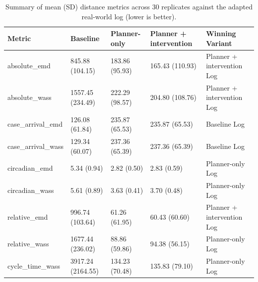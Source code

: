 \begin{table}
\caption{Summary of mean (SD) distance metrics across 30 replicates against the adapted real-world log (lower is better).}
\label{tab:results}
\begin{tabular}{lllll}
\toprule
Metric & Baseline & Planner-only & Planner + intervention & Winning Variant \\
\midrule
absolute_emd & 845.88 (104.15) & 183.86 (95.93) & 165.43 (110.93) & Planner + intervention Log \\
absolute_wass & 1557.45 (234.49) & 222.29 (98.57) & 204.80 (108.76) & Planner + intervention Log \\
case_arrival_emd & 126.08 (61.84) & 235.87 (65.53) & 235.87 (65.53) & Baseline Log \\
case_arrival_wass & 129.34 (60.07) & 237.36 (65.39) & 237.36 (65.39) & Baseline Log \\
circadian_emd & 5.34 (0.94) & 2.82 (0.50) & 2.83 (0.59) & Planner-only Log \\
circadian_wass & 5.61 (0.89) & 3.63 (0.41) & 3.70 (0.48) & Planner-only Log \\
relative_emd & 996.74 (103.64) & 61.26 (61.95) & 60.43 (60.60) & Planner + intervention Log \\
relative_wass & 1677.44 (236.02) & 88.86 (59.86) & 94.38 (56.15) & Planner-only Log \\
cycle_time_wass & 3917.24 (2164.55) & 134.23 (70.48) & 135.83 (79.10) & Planner-only Log \\
\bottomrule
\end{tabular}
\end{table}
